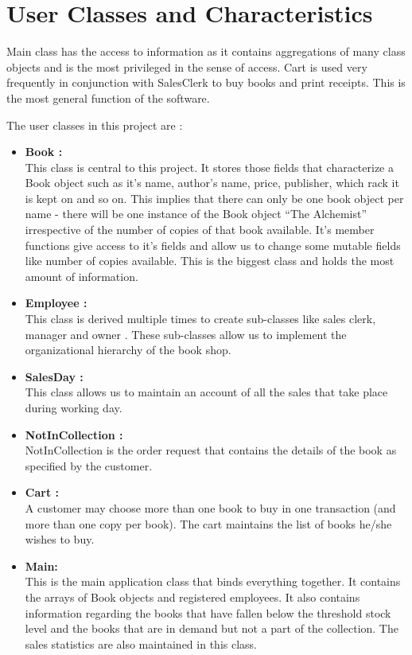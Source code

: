 \documentclass{scrreprt}
\begin{document}
\section{User Classes and Characteristics}
 Main class has the access to information as it contains aggregations of many class objects and is the most privileged in the sense of access. Cart is used very frequently in conjunction with SalesClerk to buy books and print receipts. This is the most general function of the software.

The user classes in this project are : \\ 
\begin{itemize}

\item  \textbf{Book :}\\ This class is central to this project. It stores those fields that characterize a Book object such as it's name, author's name, price, publisher, which rack it is kept on and so on. This implies that there can only be one book object per name - there will be one instance of the Book object “The Alchemist” irrespective of the number of copies of that book available. It's member functions give access to it's fields and allow us to change some mutable fields like number of copies available. This is the biggest class and holds the most amount of information.

\item  \textbf{Employee :} \\This class is derived multiple times to create sub-classes like sales clerk, manager and owner . These sub-classes allow us to implement the organizational hierarchy of the book shop.

\item    \textbf{SalesDay :} \\This class allows us to maintain an account of all the sales that take place during working day.

\item \textbf{NotInCollection :}\\  NotInCollection is the order request that contains the details of the book as specified by the customer.

\item \textbf{Cart :}\\ A customer may choose more than one book to buy in one transaction (and more than one copy per book). The cart maintains the list of books he/she wishes to buy.

\item \textbf {Main:}\\ This is the main application class that binds everything together. It contains the arrays of Book objects and registered employees. It also contains information regarding the books that have fallen below the threshold stock level and the books that are in demand but not a part of the collection. The sales statistics are also maintained in this class.


\end{itemize}
\end{document}
